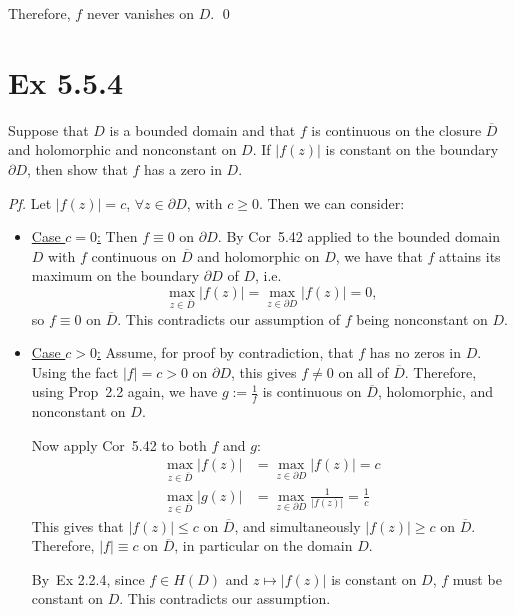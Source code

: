\documentclass[a4paper]{article}
\begin{document}
\medskip
Therefore, $f$ never vanishes on $D$. \qed

\newpage
\section*{Ex 5.5.4}

\begin{tcolorbox}[colback=gray!10, colframe=black, boxrule=0.5pt, arc=2mm]
Suppose that $D$ is a bounded domain and that $f$ is continuous on the closure $\overline{D}$ and holomorphic and nonconstant on $D$. If $|f(z)|$ is constant on the boundary $\partial D$, then show that $f$ has a zero in $D$.
\end{tcolorbox}

\textit{Pf.} Let $|f(z)| = c$, $\forall z \in \partial D$, with $c \geq 0$. Then we can consider:

\begin{itemize}
    \item \underline{Case $c = 0$:} Then $f \equiv 0$ on $\partial D$. By Cor~5.42 applied to the bounded domain $D$ with $f$ continuous on $\overline{D}$ and holomorphic on $D$, we have that $f$ attains its maximum on the boundary $\partial D$ of $D$, i.e.
    \[
    \max_{z \in \overline{D}} |f(z)| = \max_{z \in \partial D} |f(z)| = 0,
    \]
    so $f \equiv 0$ on $\overline{D}$. This contradicts our assumption of $f$ being nonconstant on $D$.

    \item \underline{Case $c > 0$:} Assume, for proof by contradiction, that $f$ has no zeros in $D$. Using the fact $|f| = c > 0$ on $\partial D$, this gives $f \neq 0$ on all of $\overline{D}$. Therefore, using Prop~2.2 again, we have $\displaystyle g := \frac{1}{f}$ is continuous on $\overline{D}$, holomorphic, and nonconstant on $D$.

    Now apply Cor~5.42 to both $f$ and $g$:
    \begin{align*}
    \max_{z \in \overline{D}} |f(z)| &= \max_{z \in \partial D} |f(z)| = c \\
    \max_{z \in \overline{D}} |g(z)| &= \max_{z \in \partial D} \frac{1}{|f(z)|} = \frac{1}{c}
    \end{align*}
    This gives that $|f(z)| \leq c$ on $\overline{D}$, and simultaneously $|f(z)| \geq c$ on $\overline{D}$. Therefore, $|f| \equiv c$ on $\overline{D}$, in particular on the domain $D$.
    
    By~Ex 2.2.4, since $f \in H(D)$ and $z \mapsto |f(z)|$ is constant on $D$, $f$ must be constant on $D$. This contradicts our assumption.
\end{itemize}
\end{document}
